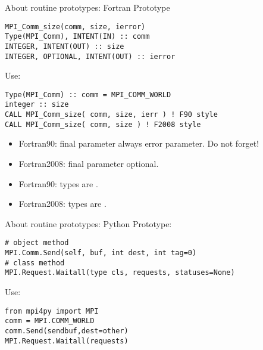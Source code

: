 \begin{mpithree}
\begin{frame}[containsverbatim]{About routine prototypes: Fortran}
Prototype
\lstset{language=Fortran}
\begin{lstlisting}
MPI_Comm_size(comm, size, ierror)
Type(MPI_Comm), INTENT(IN) :: comm
INTEGER, INTENT(OUT) :: size
INTEGER, OPTIONAL, INTENT(OUT) :: ierror
\end{lstlisting}
Use:
\lstset{language=Fortran}
\begin{lstlisting}
Type(MPI_Comm) :: comm = MPI_COMM_WORLD
integer :: size
CALL MPI_Comm_size( comm, size, ierr ) ! F90 style
CALL MPI_Comm_size( comm, size ) ! F2008 style
\end{lstlisting}
\begin{itemize}
\item Fortran90: final parameter always error parameter. Do not
  forget!
\item Fortran2008: final parameter optional.
\item Fortran90:  types are .
\item Fortran2008:  types are .
\end{itemize}
\end{frame}
\end{mpithree}

\begin{frame}[containsverbatim]{About routine prototypes: Python}
Prototype:
\lstset{language=Python}
\begin{lstlisting}
# object method
MPI.Comm.Send(self, buf, int dest, int tag=0)
# class method
MPI.Request.Waitall(type cls, requests, statuses=None)
\end{lstlisting}
Use:
\begin{lstlisting}
from mpi4py import MPI
comm = MPI.COMM_WORLD
comm.Send(sendbuf,dest=other)
MPI.Request.Waitall(requests)
\end{lstlisting}
\end{frame}


\begin{exerciseframe}[commrank]
  
\end{exerciseframe}

\begin{exerciseframe}[commrank]
  
\end{exerciseframe}

\begin{optexerciseframe}
  
\end{optexerciseframe}

